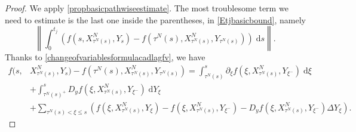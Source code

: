 \documentclass[reqno,12pt]{amsart}
\theoremstyle{plain} %
\theoremstyle{definition} %
\begin{document}
\begin{proof}
    We apply \cref{propbasicpathwiseestimate}. The most troublesome term we need to estimate is the last one inside the parentheses, in \eqref{Etjbasicbound}, namely
    \[
        \left\|\int_0^{t_j} \left( f(s, X_{\tau^N(s)}^N, Y_s) - f(\tau^N(s), X_{\tau^N(s)}^N, Y_{\tau^N(s)}) \right)\;\mathrm{d}s\right\|.
    \]
    Thanks to \eqref{changeofvariablesformulacadlagfv}, we have
    \begin{align*}
        f(s, & X_{\tau^N(s)}^N, Y_s) - f(\tau^N(s), X_{\tau^N(s)}^N, Y_{\tau^N(s)}) = \int_{\tau^N(s)}^s \partial_\xi f(\xi, X_{\tau^N(s)}^N, Y_{\xi^-})\;\mathrm{d}\xi \\
        & + \int_{\tau^N(s)^+}^s D_y f(\xi, X_{\tau^N(s)}^N, Y_{\xi^-}) \;\mathrm{d}Y_\xi \\
        & + \sum_{\tau^N(s) < \xi \leq s} \left(f(\xi, X_{\tau^N(s)}^N, Y_\xi) - f(\xi, X_{\tau^N(s)}^N, Y_{\xi^{-}}) - D_y f(\xi, X_{\tau^N(s)}^N, Y_{\xi^-})\Delta Y_\xi\right).
    \end{align*}
    

\end{proof}
\end{document}
